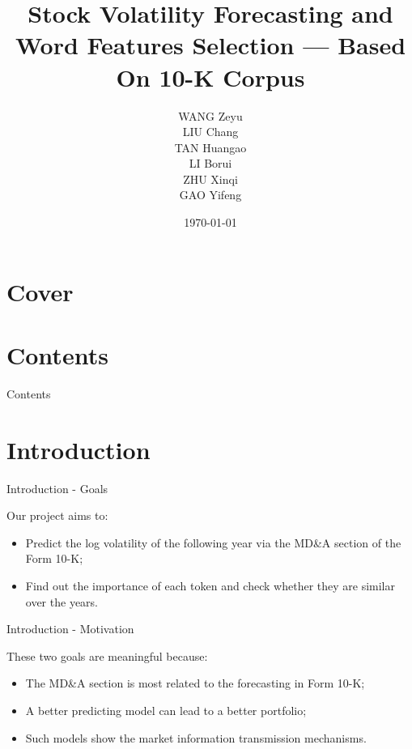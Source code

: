\documentclass{beamer}
\title{Stock Volatility Forecasting and Word Features Selection --- Based On 10-K Corpus}
\author{
  \parbox{0.3\textwidth}{
    \centering WANG Zeyu
    \vspace{.25cm}
  }
  \parbox{0.3\textwidth}{
    \centering LIU Chang
    \vspace{.25cm}
  }
  \parbox{0.3\textwidth}{
    \centering TAN Huangao
    \vspace{.25cm}
  }
  \parbox{0.3\textwidth}{
    \centering LI Borui
  }
  \parbox{0.3\textwidth}{
    \centering ZHU Xinqi
  }
  \parbox{0.3\textwidth}{
    \centering GAO Yifeng
  }
}
\date{\today}
\begin{document}
\section*{Cover}
\frame{\titlepage}

\section*{Contents}
\begin{frame}{Contents}
  \tableofcontents
\end{frame}

\section{Introduction}

\begin{frame}{Introduction - Goals}

  Our project aims to: \vspace{.25cm}
  \begin{itemize}
    \item Predict the log volatility of the following year via the MD\&A section of the Form 10-K; \vspace{.25cm}
    \item Find out the importance of each token and check whether they are similar over the years.
  \end{itemize}

\end{frame}

\begin{frame}{Introduction - Motivation}

  These two goals are meaningful because: \vspace{.25cm}

  \begin{itemize}
    \item The MD\&A section is most related to the forecasting in Form 10-K; \vspace{.25cm}
    \item A better predicting model can lead to a better portfolio; \vspace{.25cm}
    \item Such models show the market information transmission mechanisms. \vspace{.25cm}
  \end{itemize}

\end{frame}
\end{document}
